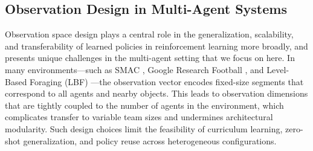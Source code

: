 \documentclass{article}
\begin{document}




        \subsection{Observation Design in Multi-Agent Systems}

        Observation space design plays a central role in the generalization, scalability, 
        and transferability of learned policies in reinforcement learning more broadly, 
        and presents unique challenges in the multi-agent setting that we focus on here. 
        In many environments—such as SMAC \cite{samvelyan2019}, Google Research Football \cite{kurach2020},
        and Level-Based Foraging (LBF) \cite{papoudakis2021}—the observation vector encodes fixed-size 
        segments that correspond to all agents and nearby objects. 
        This leads to observation dimensions that are tightly coupled to the number of agents
        in the environment, which complicates transfer to variable team sizes and undermines architectural
        modularity. 
        Such design choices limit the feasibility of curriculum learning, zero-shot generalization,
        and policy reuse across heterogeneous configurations.
        
\end{document}

